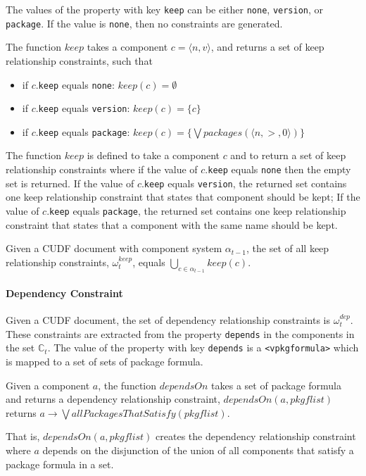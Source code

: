 The values of the property with key \texttt{keep} can be either \texttt{none}, \texttt{version}, or \texttt{package}.
If the value is \texttt{none}, then no constraints are generated.
\begin{defs}
The function $keep$ takes a component $c = \langle n ,v \rangle$, and returns a set of keep relationship constraints, such that
\begin{itemize}
	\item if $c$.\verb+keep+ equals \verb+none+: $keep(c) = \emptyset$
	\item if $c$.\verb+keep+ equals \verb+version+: $keep(c) = \{c\}$
	\item if $c$.\verb+keep+ equals \verb+package+: $keep(c) = \{\bigvee packages(\langle n, >, 0 \rangle)\}$
\end{itemize}
\end{defs}
The function $keep$ is defined to take a component $c$ and to return a set of keep relationship constraints where
if the value of $c$.\verb+keep+ equals \verb+none+ then the empty set is returned.
If the value of $c$.\verb+keep+ equals \verb+version+, the returned set contains one keep relationship constraint that states that component should be kept;
If the value of $c$.\verb+keep+ equals \verb+package+, 
the returned set contains one keep relationship constraint that states that a component with the same name should be kept. 

\begin{defs}
Given a CUDF document with component system $\alpha_{t-1}$, the set of all keep relationship constraints, $\omega_t^{keep}$, 
equals $\bigcup \limits_{c \in \alpha_{t-1}} keep(c)$.
\end{defs}

\paragraph{Dependency Constraint}
Given a CUDF document, the set of dependency relationship constraints is $\omega_t^{dep}$.
These constraints are extracted from the property \texttt{depends} in the components in the set $\mathbb{C}_t$.
The value of the property with key \texttt{depends} is a \texttt{<vpkgformula>} which is mapped to a set of sets of package formula.

\begin{defs}
Given a component $a$, the function $dependsOn$ takes a set of package formula and returns a dependency relationship constraint,
$dependsOn(a,pkgflist)$ returns $a \rightarrow \bigvee allPackagesThatSatisfy(pkgflist)$.
\end{defs}
That is, $dependsOn(a,pkgflist)$ creates the dependency relationship constraint where $a$ depends on the disjunction of the union of all components that satisfy a package formula in a set. 

